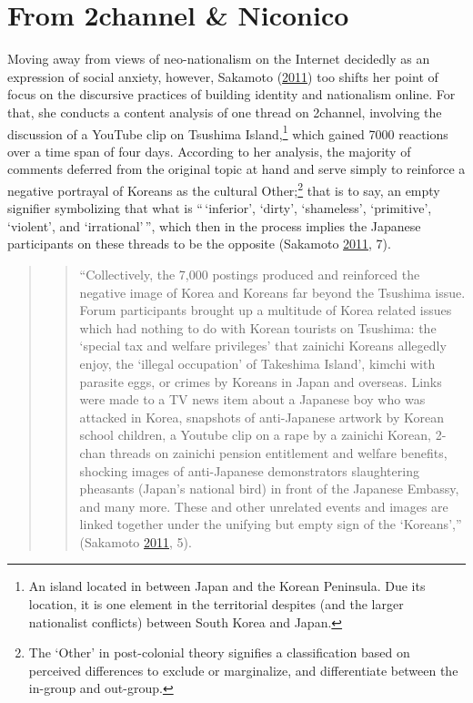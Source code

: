 \documentclass[10pt,british,A4paper,twoside]{memoir}
\begin{document}
\section{From 2channel \& Niconico}\label{from-2channel-niconico}

Moving away from views of neo-nationalism on the Internet decidedly as
an expression of social anxiety, however, Sakamoto
(\protect\hyperlink{ref-sakamoto_koreans_2011}{2011}) too shifts her
point of focus on the discursive practices of building identity and
nationalism online. For that, she conducts a content analysis of one
thread on 2channel, involving the discussion of a YouTube clip on
Tsushima Island,\footnote{An island located in between Japan and the
  Korean Peninsula. Due its location, it is one element in the
  territorial despites (and the larger nationalist conflicts) between
  South Korea and Japan.} which gained 7000 reactions over a time span
of four days. According to her analysis, the majority of comments
deferred from the original topic at hand and serve simply to reinforce a
negative portrayal of Koreans as the cultural Other;\footnote{The
  `Other' in post-colonial theory signifies a classification based on
  perceived differences to exclude or marginalize, and differentiate
  between the in-group and out-group.} that is to say, an empty
signifier symbolizing that what is ``\,`inferior', `dirty', `shameless',
`primitive', `violent', and `irrational'\,'', which then in the process
implies the Japanese participants on these threads to be the opposite
(Sakamoto \protect\hyperlink{ref-sakamoto_koreans_2011}{2011}, 7).

\begin{quote}
\begin{quote}
``Collectively, the 7,000 postings produced and reinforced the negative
image of Korea and Koreans far beyond the Tsushima issue. Forum
participants brought up a multitude of Korea related issues which had
nothing to do with Korean tourists on Tsushima: the `special tax and
welfare privileges' that zainichi Koreans allegedly enjoy, the `illegal
occupation' of Takeshima Island', kimchi with parasite eggs, or crimes
by Koreans in Japan and overseas. Links were made to a TV news item
about a Japanese boy who was attacked in Korea, snapshots of
anti-Japanese artwork by Korean school children, a Youtube clip on a
rape by a zainichi Korean, 2-chan threads on zainichi pension
entitlement and welfare benefits, shocking images of anti-Japanese
demonstrators slaughtering pheasants (Japan's national bird) in front of
the Japanese Embassy, and many more. These and other unrelated events
and images are linked together under the unifying but empty sign of the
`Koreans','' (Sakamoto
\protect\hyperlink{ref-sakamoto_koreans_2011}{2011}, 5).
\end{quote}
\end{quote}
\end{document}
